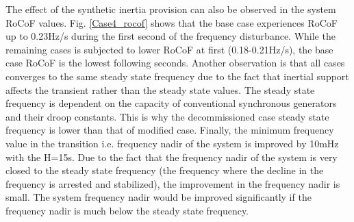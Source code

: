 The effect of the synthetic inertia provision can also be observed in the system RoCoF values. Fig. \ref{Case4_rocof} shows that the base case experiences RoCoF up to 0.23Hz/s during the first second of the frequency disturbance. While the remaining cases is subjected to lower RoCoF at first (0.18-0.21Hz/s), the base case RoCoF is the lowest following seconds. Another observation is that all cases converges to the same steady state frequency due to the fact that inertial support affects the transient rather than the steady state values. The steady state frequency is dependent on the capacity of conventional synchronous generators and their droop constants. This is why the decommissioned case steady state frequency is lower than that of modified case. Finally, the minimum frequency value in the transition i.e. frequency nadir of the system is improved by 10mHz with the H=15s. Due to the fact that the frequency nadir of the system is very closed to the steady state frequency (the frequency where the decline in the frequency is arrested and stabilized), the improvement in the frequency nadir is small. The system frequency nadir would be improved significantly if the frequency nadir is much below the steady state frequency.

